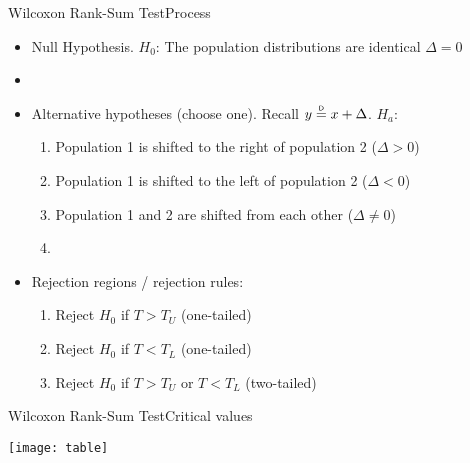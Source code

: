 \documentclass[xcolor=dvipsnames]{beamer}
\newcommand\myeq{\mathrel{\overset{\makebox[0pt]{\mbox{\normalfont\tiny\sffamily D}}}{=}}}
\begin{document}
\begin{frame}{Wilcoxon Rank-Sum Test}{Process}
	\begin{itemize}
		\item Null Hypothesis. $H_0$: The population distributions are identical $\Delta = 0$ \pause
		\item[]
		\item Alternative hypotheses (choose one). Recall $y \myeq x + \Delta$. $H_a$:\pause
			\begin{enumerate}
				\item Population 1 is shifted to the right of population 2 ($\Delta >0$)\pause
				\item Population 1 is shifted to the left of population 2 ($\Delta < 0$)\pause
				\item Population 1 and 2 are shifted from each other ($\Delta \neq 0$)\pause
				\item[]
			\end{enumerate}
		\item Rejection regions / rejection rules:
		\begin{enumerate}
			\item Reject $H_0$ if $T > T_U$ (one-tailed) \pause
			\item Reject $H_0$ if $T < T_L$ (one-tailed) \pause
			\item Reject $H_0$ if $T > T_U$ or $T < T_L$ (two-tailed)
		\end{enumerate}
		\end{itemize}
\end{frame}

\begin{frame}{Wilcoxon Rank-Sum Test}{Critical values}
	\begin{center}
		\texttt{[image: table]}
	\end{center}
\end{frame}
\end{document}
